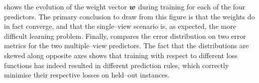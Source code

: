  shows the evolution of the weight vector
$\Model$ during training for each of the four predictors. The primary
conclusion to draw from this figure is that the weights do in fact
converge, and that the single--view scenario is, as expected, the more
difficult learning problem. Finally,
 compares the error distribution on two
error metrics for the two multiple--view predictors. The fact that the
distributions are skewed along opposite axes shows that training
with respect to different loss functions has indeed resulted in
different prediction rules, which correctly minimise their respective
losses on held--out instances.

\begin{table}[h]
  \centering

\end{table}
